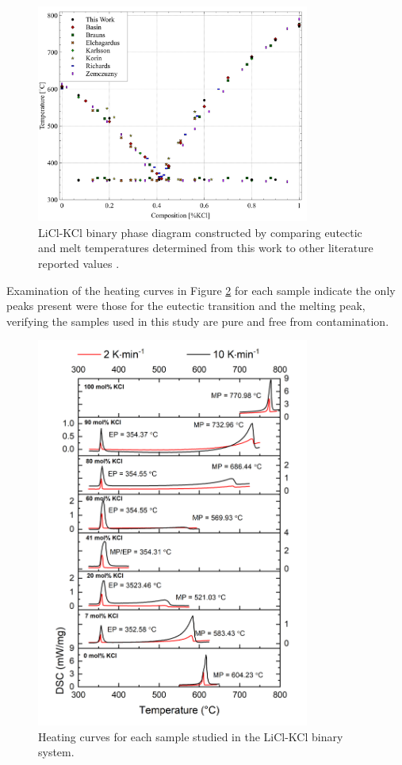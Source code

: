 \documentclass[review]{elsarticle}
\begin{document}
\begin{figure}[]
 \centering
 \includegraphics[width=0.8\textwidth]{images/DSC analysis.jpg} 
 \caption{LiCl-KCl binary phase diagram constructed by comparing eutectic and melt temperatures determined from this work to other literature reported values \cite{RN79,RN78,RN77,RN76,RN75,RN16}.}
 \label{fig:figureDSC}
\end{figure}

Examination of the heating curves in Figure \ref{fig:figureDSC2} for each sample indicate the only peaks present were those for the eutectic transition and the melting peak, verifying the samples used in this study are pure and free from contamination.  

\begin{figure}[]
 \centering
 \includegraphics[width=0.8\textwidth]{images/DSCheatcurves.jpg} 
 \caption{Heating curves for each sample studied in the LiCl-KCl binary system. }
 \label{fig:figureDSC2}
\end{figure}
\end{document}
